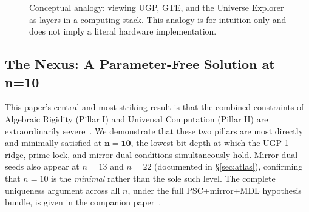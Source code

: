 \documentclass[12pt]{article}
\numberwithin{equation}{section}
\begin{document}
\begin{figure}[H]
\centering
{}
\caption{Conceptual analogy: viewing UGP, GTE, and the Universe Explorer as layers in a computing stack. This analogy is for intuition only and does not imply a literal hardware implementation.}
\label{fig:stackanalogy}
\end{figure}

\subsection{The Nexus: A Parameter-Free Solution at n=10}
This paper's central and most striking result is that the combined constraints of Algebraic Rigidity (Pillar I) and Universal Computation (Pillar II) are extraordinarily severe~\cite{SpivackUGPFormalization,ugp-lean}. We demonstrate that these two pillars are most directly and minimally satisfied at $\mathbf{n=10}$, the lowest bit-depth at which the UGP-1 ridge, prime-lock, and mirror-dual conditions simultaneously hold. Mirror-dual seeds also appear at $n=13$ and $n=22$ (documented in §\ref{sec:atlas}), confirming that $n=10$ is the \emph{minimal} rather than the sole such level. The complete uniqueness argument across all $n$, under the full PSC+mirror+MDL hypothesis bundle, is given in the companion paper~\cite{SpivackUGPUniqueness}.
\end{document}
